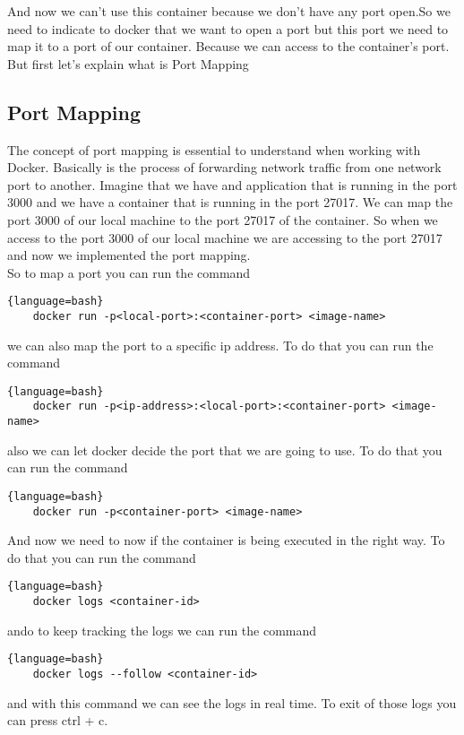 \documentclass{article}
\begin{document}
 And now we can't use this container because we don't have any port open.So we need to indicate to docker that we want to 
 open a port but this port we need to map it to a port of our container. Because we can access to the container's port. 
 But first let's explain what is Port Mapping 
     \subsection*{Port Mapping}
        The concept of port mapping is essential to understand when working with Docker. Basically is the process of 
        forwarding network traffic from one network port to another. Imagine that we have and application that is running in
        the port 3000 and we have a container that is running in the port 27017. We can map the port 3000 of our local machine
        to the port 27017 of the container. So when we access to the port 3000 of our local machine we are accessing to the 
        port 27017 and now we implemented the port mapping.
    \\

So to map a port you can run the command
\begin{lstlisting}{language=bash}
    docker run -p<local-port>:<container-port> <image-name>
\end{lstlisting}

we can also map the port to a specific ip address. To do that you can run the command
\begin{lstlisting}{language=bash}
    docker run -p<ip-address>:<local-port>:<container-port> <image-name>
\end{lstlisting}
 also we can let docker decide the port that we are going to use. To do that you can run the command
\begin{lstlisting}{language=bash}
    docker run -p<container-port> <image-name>
\end{lstlisting}

And now we need to now if the container is being executed in the right way. To do that you can run the command
\begin{lstlisting}{language=bash}
    docker logs <container-id>
\end{lstlisting}
 ando to keep tracking the logs we can run the command
\begin{lstlisting}{language=bash}
    docker logs --follow <container-id>
\end{lstlisting}
and with this command we can see the logs in real time. To exit of those logs you can press ctrl + c.
\end{document}
